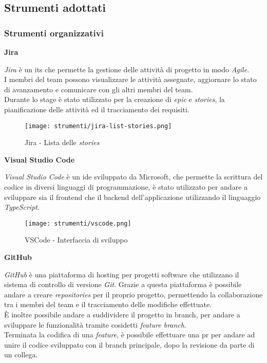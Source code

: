 \pagebreak
\subsection{Strumenti adottati}
\label{sez:strumenti-adottati}

\subsubsection{Strumenti organizzativi}
\label{sez:strumenti-organizzativi}

\noindent \textbf{Jira\\}

\noindent \textit{Jira} è un \gls{its} che permette la gestione delle attività di progetto in modo \textit{Agile}.\\
I membri del team possono visualizzare le attività assegnate, aggiornare lo stato di avanzamento e comunicare con gli altri membri del team. \\
Durante lo stage è stato utilizzato per la creazione di \textit{epic} e \textit{stories}, la pianificazione delle attività ed il tracciamento dei requisiti.

\begin{figure}[H]
    \label{fig:jira-list-stories}
    \centering
    \texttt{[image: strumenti/jira-list-stories.png]}
    \caption{Jira - Lista delle \textit{stories}}
\end{figure}



\noindent \textbf{Visual Studio Code\\}

\noindent \textit{Visual Studio Code} è un \gls{ide} sviluppato da Microsoft, che permette la scrittura del codice in diversi linguaggi di programmazione, è stato utilizzato per andare
a sviluppare sia il \gls{frontend} che il \gls{backend} dell'applicazione utilizzando il linguaggio \textit{TypeScript}.\\

\begin{figure}[H]
    \label{fig:vscode}
    \centering
    \texttt{[image: strumenti/vscode.png]}
    \caption{VSCode - Interfaccia di sviluppo}
\end{figure}

\pagebreak  
\noindent \textbf{GitHub\\}

\noindent \textit{GitHub} è una piattaforma di hosting per progetti software che utilizzano il sistema di controllo di versione \textit{Git}.
Grazie a questa piattaforma è possibile andare a creare \textit{repositories} per il proprio progetto, permettendo la collaborazione tra i membri del team e il tracciamento delle modifiche effettuate. \\
È inoltre possibile andare a suddividere il progetto in \gls{branch}, per andare a sviluppare le funzionalità tramite cosidetti \textit{feature branch}.\\
Terminata la codifica di una \textit{feature}, è possibile effettuare una \gls{pr} per andare ad unire il codice sviluppato con il \gls{branch} principale, dopo la revisione da parte di un collega.


